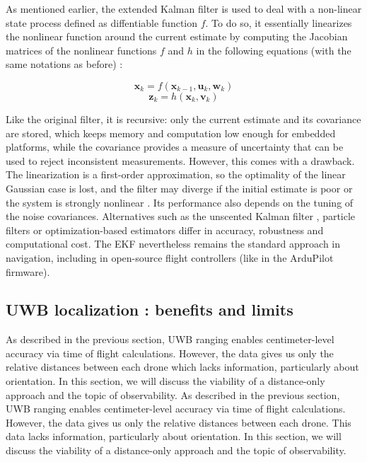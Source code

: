 As mentioned earlier, the extended Kalman filter is used to deal with a non-linear state process defined as diffentiable function $f$. To do so, it essentially linearizes the nonlinear function around the current estimate by computing the Jacobian matrices of the nonlinear functions $f$ and $h$ in the following equations (with the same notations as before) :

$$ {\displaystyle {\textbf {x}}_{k}=f({\textbf {x}}_{k-1},{\textbf {u}}_{k},{\textbf {w}}_{k})}$$
$${\displaystyle {\textbf {z}}_{k}=h({\textbf {x}}_{k},{\textbf {v}}_{k})}$$

\color{blue}
Like the original filter, it is recursive: only the current estimate and its covariance are stored, which keeps memory and computation low enough for embedded platforms, while the covariance provides a measure of uncertainty that can be used to reject inconsistent measurements. However, this comes with a drawback. The linearization is a first-order approximation, so the optimality of the linear Gaussian case is lost, and the filter may diverge if the initial estimate is poor or the system is strongly nonlinear \parencite{boutayeb_convergence_1997}. Its performance also depends on the tuning of the noise covariances. Alternatives such as the unscented Kalman filter \parencite{julier_new_1997}, particle filters \parencite{arulampalam_tutorial_2002} or optimization-based estimators differ in accuracy, robustness and computational cost. The EKF nevertheless remains the standard approach in navigation, including in open-source flight controllers (like in the ArduPilot firmware).
\newpage

\subsection{UWB localization : benefits and limits }

As described in the previous section, UWB ranging enables centimeter-level accuracy via time of flight calculations. However, the data gives us only the relative distances between each drone which lacks information, particularly about orientation. In this section, we will discuss the viability of a distance-only approach and the topic of observability.
As described in the previous section, UWB ranging enables centimeter-level accuracy via time of flight calculations. However, the data gives us only the relative distances between each drone. This data lacks information, particularly about orientation. In this section, we will discuss the viability of a distance-only approach and the topic of observability.

